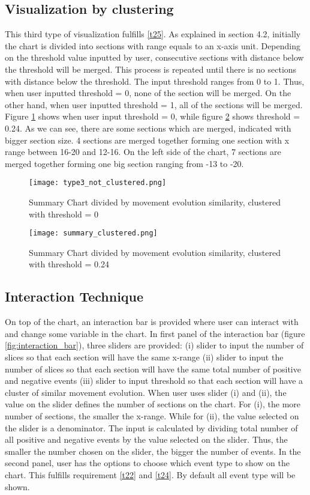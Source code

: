\subsection{Visualization by clustering}
This third type of visualization fulfills \ref{t25}. As explained in section 4.2, initially the chart is divided into sections with range equals to an x-axis unit. Depending on the threshold value inputted by user, consecutive sections with distance below the threshold will be merged. This process is repeated until there is no sections with distance below the threshold. The input threshold ranges from 0 to 1. Thus, when user inputted threshold = 0, none of the section will be merged. On the other hand, when user inputted threshold = 1, all of the sections will be merged. Figure \ref{fig:type3_not_clustered} shows when user input threshold = 0, while figure \ref{fig:type3_clustered} shows threshold = 0.24. As we can see, there are some sections which are merged, indicated with bigger section size. 4 sections are merged together forming one section with x range between 16-20 and 12-16. On the left side of the chart, 7 sections are merged together forming one big section ranging from -13 to -20.

\begin{figure}
\centering
\texttt{[image: type3\_not\_clustered.png]}
\caption{Summary Chart divided by movement evolution similarity, clustered with threshold = 0}
\label{fig:type3_not_clustered}
\end{figure}

\begin{figure}
\centering
\texttt{[image: summary\_clustered.png]}
\caption{Summary Chart divided by movement evolution similarity, clustered with threshold = 0.24}
\label{fig:type3_clustered}
\end{figure}

\subsection{Interaction Technique}
On top of the chart, an interaction bar is provided where user can interact with and change some variable in the chart. In first panel of the interaction bar (figure \ref{fig:interaction_bar}), three sliders are provided: (i) slider to input the number of slices so that each section will have the same x-range (ii) slider to input the number of slices so that each section will have the same total number of positive and negative events (iii) slider to input threshold so that each section will have a cluster of similar movement evolution. When user uses slider (i) and (ii), the value on the slider defines the number of sections on the chart. For (i), the more number of sections, the smaller the x-range. While for (ii), the value selected on the slider is a denominator. The input is calculated by dividing total number of all positive and negative events by the value selected on the slider. Thus, the smaller the number chosen on the slider, the bigger the number of events. In the second panel, user has the options to choose which event type to show on the chart. This fulfills requirement \ref{t22} and \ref{t24}. By default all event type will be shown. 

